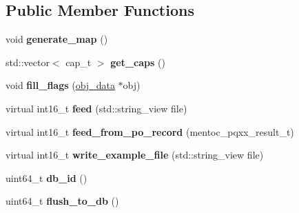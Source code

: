 \subsection*{Public Member Functions}
\begin{DoxyCompactItemize}
\item 
\mbox{\label{structmods_1_1yaml_1_1rifle__description__t_aa4f876fad47e5e2837fd59a7adc1e05d}} 
void {\bfseries generate\+\_\+map} ()
\item 
\mbox{\label{structmods_1_1yaml_1_1rifle__description__t_aa551df6fd09f0914cfcdb87d8d5f4d07}} 
std\+::vector$<$ cap\+\_\+t $>$ {\bfseries get\+\_\+caps} ()
\item 
\mbox{\label{structmods_1_1yaml_1_1rifle__description__t_a0681cbea388ab8fa8ceaee8f19ee1a8d}} 
void {\bfseries fill\+\_\+flags} (\hyperlink{structobj__data}{obj\+\_\+data} $\ast$obj)
\item 
\mbox{\label{structmods_1_1yaml_1_1rifle__description__t_aa8059716e3671ba5ffacf40f315ff264}} 
virtual int16\+\_\+t {\bfseries feed} (std\+::string\+\_\+view file)
\item 
\mbox{\label{structmods_1_1yaml_1_1rifle__description__t_ade6572d4641fa54a44c82d557fe96621}} 
virtual int16\+\_\+t {\bfseries feed\+\_\+from\+\_\+po\+\_\+record} (mentoc\+\_\+pqxx\+\_\+result\+\_\+t)
\item 
\mbox{\label{structmods_1_1yaml_1_1rifle__description__t_a4a12a82e6c6a2d0ffda3868a9d99b725}} 
virtual int16\+\_\+t {\bfseries write\+\_\+example\+\_\+file} (std\+::string\+\_\+view file)
\item 
\mbox{\label{structmods_1_1yaml_1_1rifle__description__t_a5677a726c8dd1c5114be47ac5a277ccb}} 
uint64\+\_\+t {\bfseries db\+\_\+id} ()
\item 
\mbox{\label{structmods_1_1yaml_1_1rifle__description__t_a2bd3c88d3a140481d215f5514c44900c}} 
uint64\+\_\+t {\bfseries flush\+\_\+to\+\_\+db} ()
\end{DoxyCompactItemize}
